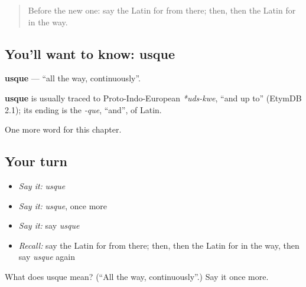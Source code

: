 \begin{quote}
Before the new one: say the Latin for from there; then, then the Latin for in the way.
\end{quote}

\subsection*{You'll want to know: usque}
\textbf{usque} — \textquotedblleft{}all the way, continuously\textquotedblright{}.

\begin{cousinweb}
\textbf{usque} is usually traced to Proto-Indo-European \emph{*uds-kwe}, \textquotedblleft{}and up to\textquotedblright{} (EtymDB 2.1); its ending is the \emph{-que}, \textquotedblleft{}and\textquotedblright{}, of Latin.
\end{cousinweb}

\begin{grammarlens}[title={What you've built}]
One more word for this chapter.
\end{grammarlens}

\subsection*{Your turn}
\begin{itemize}
\raggedright
  \item \emph{Say it:} \emph{usque}
  \item \emph{Say it:} \emph{usque}, once more
  \item \emph{Say it:} say \emph{usque}
  \item \emph{Recall:} say the Latin for from there; then, then the Latin for in the way, then say \emph{usque} again
\end{itemize}

\begin{tcolorbox}[breakable,colback=teal!4,colframe=teal!35!black,title={Before you move on}]
What does usque mean? (\textquotedblleft{}All the way, continuously\textquotedblright{}.) Say it once more.
\end{tcolorbox}
